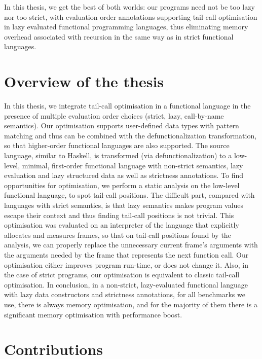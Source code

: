 \documentclass[diploma]{softlab-thesis}
\begin{document}
In this thesis, we get the best of both worlds: our programs need not be too lazy nor too strict,
with evaluation order annotations supporting tail-call optimisation in lazy evaluated 
functional programming languages, thus eliminating memory overhead associated with recursion in the 
same way as in strict functional languages.

\section {Overview of the thesis}

In this thesis, we integrate tail-call optimisation in a functional 
language in the presence of multiple evaluation order choices (strict, lazy, call-by-name semantics). 
Our optimisation supports user-defined data types with pattern matching and thus can be combined with the
defunctionalization transformation, so that higher-order functional languages are also supported. The source language, similar to Haskell, 
is transformed (via defunctionalization) to a low-level, minimal, first-order functional language 
with non-strict semantics, lazy evaluation and lazy structured data as well as strictness 
annotations. To find opportunities for optimisation, we perform a static analysis on the 
low-level functional language, to spot tail-call positions. The difficult part, 
compared with languages with strict semantics, is that lazy semantics makes program values escape 
their context and thus finding tail-call positions is not trivial. This optimisation was evaluated
on an interpreter of the language that explicitly allocates and measures frames, so that on 
tail-call positions found by the analysis, we can properly replace the unnecessary current 
frame's arguments with the arguments needed by the frame that represents the next function call. 
Our optimisation either improves program run-time, or does not change it. Also, in the case of 
strict programs, our optimisation is equivalent to classic tail-call optimisation. In conclusion,
in a non-strict, lazy-evaluated functional language with lazy data constructors and strictness 
annotations, for all benchmarks we use, there is always memory optimisation, and for the majority 
of them there is a significant memory optimisation with performance boost.

\section{Contributions}
\end{document}
